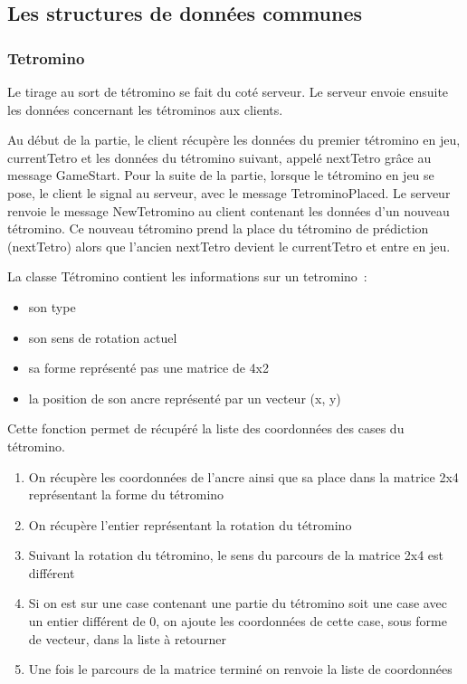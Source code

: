 \documentclass[a4paper, 12pt]{article}
\begin{document}
		\subsection{Les structures de données communes}

		\subsubsection{Tetromino}

			Le tirage au sort de tétromino se fait du coté serveur. Le serveur envoie ensuite les données concernant les tétrominos aux clients.
			
			Au début de la partie, le client récupère les données du premier tétromino en jeu, currentTetro et les données du tétromino suivant, appelé nextTetro grâce au message GameStart.
			Pour la suite de la partie, lorsque le tétromino en jeu se pose, le client le signal au serveur, avec le message TetrominoPlaced. Le serveur renvoie le message NewTetromino au client contenant les données d’un nouveau tétromino. Ce nouveau tétromino prend la place du tétromino de prédiction (nextTetro) alors que l’ancien nextTetro devient le currentTetro et entre en jeu.

			La classe Tétromino contient les informations sur un tetromino :
			\begin{itemize}
				\item son type
				\item son sens de rotation actuel
				\item sa forme représenté pas une matrice de 4x2
				\item la position de son ancre représenté par un vecteur (x, y)
			\end{itemize}


			Cette fonction permet de récupéré la liste des coordonnées des cases du tétromino.
			\begin{enumerate}

				\item On récupère les coordonnées de l’ancre ainsi que sa place dans la matrice 2x4 représentant la forme du tétromino
				\item On récupère l’entier représentant la rotation du tétromino
				\item Suivant la rotation du tétromino, le sens du parcours de la matrice 2x4 est différent
				\item Si on est sur une case contenant une partie du tétromino soit une case avec un entier différent de 0, on ajoute les coordonnées de cette case, sous forme de vecteur, dans la liste à retourner
				\item Une fois le parcours de la matrice terminé on renvoie la liste de coordonnées

			\end{enumerate}
\end{document}
